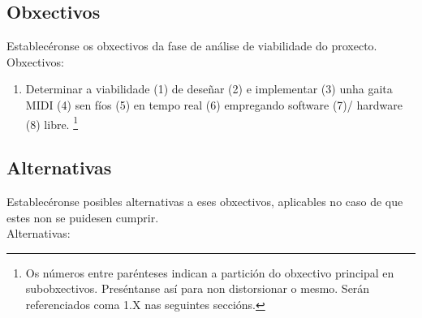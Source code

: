  \subsection{Obxectivos}

 Establecéronse os obxectivos da fase de análise de viabilidade do proxecto. \\

 Obxectivos:

 \begin{enumerate}
  \item Determinar a viabilidade (1) de deseñar (2) e implementar (3) unha
        gaita MIDI (4) sen fíos (5) en tempo real (6) empregando software (7)/
        hardware (8) libre.
        \footnote{Os números entre parénteses indican a partición do obxectivo
        principal en subobxectivos. Preséntanse así para non distorsionar o
        mesmo. Serán referenciados coma 1.X nas seguintes seccións.}
 \end{enumerate}

 \subsection{Alternativas}

 Establecéronse posibles alternativas a eses obxectivos, aplicables no caso de
 que estes non se puidesen cumprir. \\

 Alternativas:

